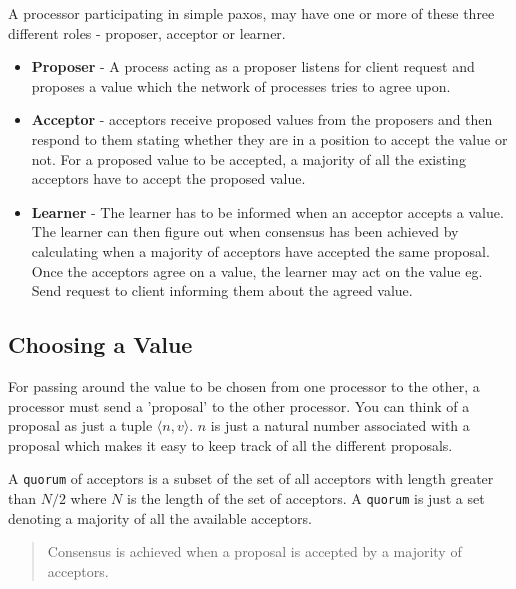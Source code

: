 A processor participating in simple paxos, may have one or more of these three
different roles - proposer, acceptor or learner.
\begin{itemize}
  \item \textbf{Proposer} - A process acting as a proposer listens for client
    request and proposes a value which the network of processes tries to agree upon.
  \item \textbf{Acceptor} - acceptors receive proposed values from the proposers
    and then respond to them stating whether they are in a position to accept the value or not.
    For a proposed value to be accepted, a majority of all the existing acceptors
    have to accept the proposed value.
  \item \textbf{Learner} - The learner has to be informed when an acceptor accepts a value.
    The learner can then figure out when consensus has been achieved by calculating
    when a majority of acceptors have accepted the same proposal.
    Once the acceptors agree on a value, the learner may act on the value
    eg. Send request to client informing them about the agreed value.
\end{itemize}


\vspace{-4mm}
\subsection{Choosing a Value}
For passing around the value to be chosen from one processor to the other,
a processor must send a 'proposal' to the other processor.
You can think of a proposal as just a tuple $\langle n, v \rangle$.
$n$ is just a natural number associated with a proposal which makes
it easy to keep track of all the different proposals.

A \texttt{quorum} of acceptors is a subset of the set of all acceptors with length greater
than $N / 2$ where $N$ is the length of the set of acceptors. A \texttt{quorum} is just
a set denoting a majority of all the available acceptors.

\begin{quote}
Consensus is achieved when a proposal is accepted by a majority of acceptors.
\end{quote}

